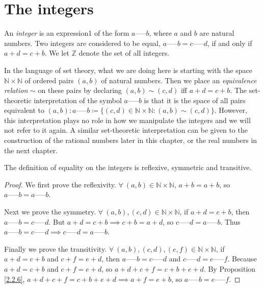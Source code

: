 \section{The integers}

\begin{definition}[Integers]\label{definition 4.1.1}
An \emph{integer} is an expression1 of the form \(a \text{-----} b\), where \(a\) and \(b\) are natural numbers.
Two integers are considered to be equal, \(a \text{-----} b = c \text{-----} d\), if and only if \(a + d = c + b\).
We let \(\mathds{Z}\) denote the set of all integers.
\end{definition}

In the language of set theory, what we are doing here is starting with the space \(\mathds{N} \times \mathds{N}\) of ordered pairs \((a, b)\) of natural numbers.
Then we place an \emph{equivalence relation} \(\sim\) on these pairs by declaring \((a, b) \sim (c, d)\) iff \(a + d = c + b\).
The set-theoretic interpretation of the symbol \(a \text{-----} b\) is that it is the space of all pairs equivalent to \((a, b): a \text{-----} b \coloneqq \{(c, d) \in \mathds{N} \times \mathds{N} : (a, b) \sim (c, d)\}\).
However, this interpretation plays no role in how we manipulate the integers and we will not refer to it again.
A similar set-theoretic interpretation can be given to the construction of the rational numbers later in this chapter, or the real numbers in the next chapter.

\begin{lemma}\label{lemma 4.1.1}
The definition of equality on the integers is reflexive, symmetric and transitive.
\end{lemma}

\begin{proof}
We first prove the reflexivity.
\(\forall\ (a, b) \in \mathds{N} \times \mathds{N}\), \(a + b = a + b\), so \(a \text{-----} b = a \text{-----} b\).

Next we prove the symmetry.
\(\forall\ (a, b), (c, d) \in \mathds{N} \times \mathds{N}\), if \(a + d = c + b\), then \(a \text{-----} b = c \text{-----} d\).
But \(a + d = c + b \implies c + b = a + d\), so \(c \text{-----} d = a \text{-----} b\).
Thus \(a \text{-----} b = c \text{-----} d \implies c \text{-----} d = a \text{-----} b\).

Finally we prove the transitivity.
\(\forall\ (a, b), (c, d), (e, f) \in \mathds{N} \times \mathds{N}\), if \(a + d = c + b\) and \(c + f = e + d\), then \(a \text{-----} b = c \text{-----} d\) and \(c \text{-----} d = e \text{-----} f\).
Because \(a + d = c + b\) and \(c + f = e + d\), so \(a + d + c + f = c + b + e + d\).
By Proposition \ref{2.2.6}, \(a + d + c + f = c + b + e + d \implies a + f = e + b\), so \(a \text{-----} b = e \text{-----} f\).
\end{proof}


